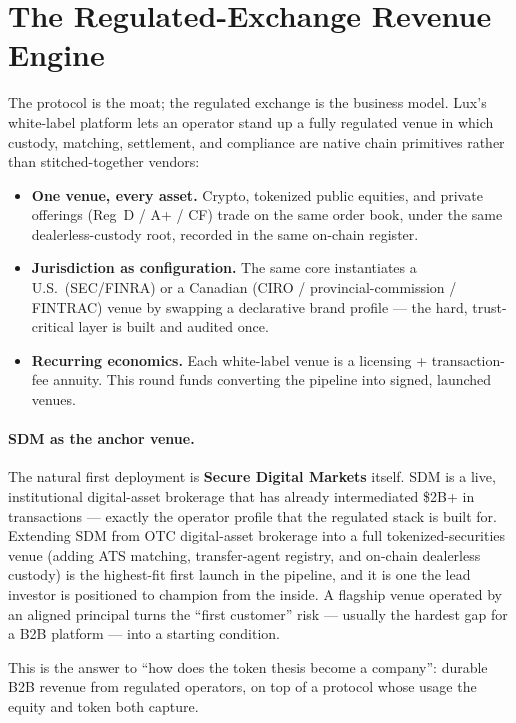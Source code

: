 \documentclass[11pt,a4paper]{article}
\begin{document}
\section{The Regulated-Exchange Revenue Engine}

The protocol is the moat; the regulated exchange is the business model.
Lux's white-label platform lets an operator stand up a fully regulated
venue in which custody, matching, settlement, and compliance are native
chain primitives rather than stitched-together vendors:

\begin{itemize}[leftmargin=1.4em]
  \item \textbf{One venue, every asset.} Crypto, tokenized public equities,
  and private offerings (Reg~D / A+ / CF) trade on the same order book,
  under the same dealerless-custody root, recorded in the same on-chain
  register.
  \item \textbf{Jurisdiction as configuration.} The same core instantiates a
  U.S.\ (SEC/FINRA) or a Canadian (CIRO / provincial-commission / FINTRAC)
  venue by swapping a declarative brand profile --- the hard,
  trust-critical layer is built and audited once.
  \item \textbf{Recurring economics.} Each white-label venue is a licensing
  + transaction-fee annuity. This round funds converting the pipeline into
  signed, launched venues.
\end{itemize}

\paragraph{SDM as the anchor venue.}
The natural first deployment is \textbf{Secure Digital Markets} itself. SDM
is a live, institutional digital-asset brokerage that has already
intermediated \$2B+ in transactions --- exactly the operator profile that
the regulated stack is built for. Extending SDM from OTC digital-asset
brokerage into a full tokenized-securities venue (adding ATS matching,
transfer-agent registry, and on-chain dealerless custody) is the highest-fit
first launch in the pipeline, and it is one the lead investor is positioned
to champion from the inside. A flagship venue operated by an aligned
principal turns the ``first customer'' risk --- usually the hardest gap for
a B2B platform --- into a starting condition.

\noindent This is the answer to ``how does the token thesis become a
company'': durable B2B revenue from regulated operators, on top of a
protocol whose usage the equity and token both capture.
\end{document}
